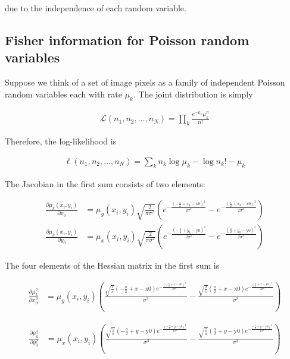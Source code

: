 \documentclass{ucetd}
\begin{document}
due to the independence of each random variable.

\subsection{Fisher information for Poisson random variables}

Suppose we think of a set of image pixels as a family of independent Poisson random variables each with rate $\mu_{k}$. The joint distribution is simply

\begin{align*}
\mathcal{L}(n_{1},n_{2},...,n_{N}) = \prod_{k} \frac{e^{-\mu_{k}}\mu_{k}^{n}}{n!}
\end{align*}

Therefore, the log-likelihood is

\begin{align*}
\ell(n_{1},n_{2},...,n_{N}) = \sum_{k} n_{k}\log\mu_{k} - \log n_{k}! - \mu_{k}
\end{align*}

The Jacobian in the first sum consists of two elements:

\begin{align*}
\frac{\partial \mu_{k}(x_{i},y_{i})}{\partial x_{0}} &= \mu_{y}(x_{i},y_{i})\sqrt{\frac{2}{\pi\sigma^{2}}}\left(e^{-\frac{\left(-\frac{a}{2}+x_{k}-\text{x0}\right)^2}{2 \sigma ^2}}-e^{-\frac{\left(\frac{a}{2}+x_{k}-\text{x0}\right)^2}{2 \sigma ^2}}\right)\\
\frac{\partial \mu_{k}(x_{i},y_{i})}{\partial y_{0}} &= \mu_{x}(x_{i},y_{i})\sqrt{\frac{2}{\pi\sigma^{2}}}\left(e^{-\frac{\left(-\frac{a}{2}+y_{k}-\text{y0}\right)^2}{2 \sigma ^2}}-e^{-\frac{\left(\frac{a}{2}+y_{k}-\text{y0}\right)^2}{2 \sigma ^2}}\right)
\end{align*}

The four elements of the Hessian matrix in the first sum is

\begin{align*}
\frac{\partial \mu_{k}^{2}}{\partial x_{0}^{2}} &= \mu_{y}(x_{i},y_{i})\left(\frac{\sqrt{\frac{2}{\pi }} \left(-\frac{a}{2}+x-\text{x0}\right) e^{-\frac{\left(-\frac{a}{2}+x-\text{x0}\right)^2}{2 \sigma ^2}}}{\sigma ^3}-\frac{\sqrt{\frac{2}{\pi }} \left(\frac{a}{2}+x-\text{x0}\right) e^{-\frac{\left(\frac{a}{2}+x-\text{x0}\right)^2}{2 \sigma ^2}}}{\sigma ^3}\right)
\end{align*}

\begin{align*}
\frac{\partial \mu_{k}^{2}}{\partial y_{0}^{2}} &= \mu_{x}(x_{i},y_{i})\left(\frac{\sqrt{\frac{2}{\pi }} \left(-\frac{a}{2}+y-\text{y0}\right) e^{-\frac{\left(-\frac{a}{2}+y-\text{y0}\right)^2}{2 \sigma ^2}}}{\sigma ^3}-\frac{\sqrt{\frac{2}{\pi }} \left(\frac{a}{2}+y-\text{y0}\right) e^{-\frac{\left(\frac{a}{2}+y-\text{y0}\right)^2}{2 \sigma ^2}}}{\sigma ^3}\right)
\end{align*}
\end{document}

